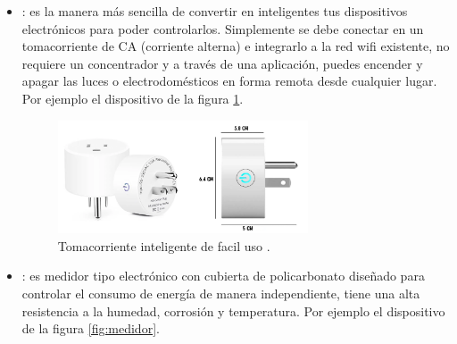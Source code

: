 \begin{itemize}

\item {}: es la manera más sencilla de convertir en inteligentes tus dispositivos electrónicos para poder controlarlos. Simplemente se debe conectar en un tomacorriente de CA (corriente alterna) e integrarlo a la red wifi existente, no requiere un concentrador y a través de una aplicación, puedes encender y apagar las luces o electrodomésticos en forma remota desde cualquier lugar. Por ejemplo el dispositivo de la figura \ref{fig:tomacorriente}.

\begin{figure}[htbp]
	\centering
\includegraphics[width=0.7\textwidth]{./Figures/tomacorriente.png}
	\caption{Tomacorriente inteligente de facil uso \protect\footnotemark.}
	\label{fig:tomacorriente}
\end{figure}


\vspace{1cm}
\vspace{1cm}
\vspace{1cm}
\vspace{1cm}
\vspace{1cm}
\vspace{1cm}
\vspace{1cm}
\vspace{1cm}



\item {}: es medidor tipo electrónico con cubierta de policarbonato diseñado para controlar el consumo de energía de manera independiente, tiene una alta resistencia a la humedad, corrosión y temperatura. Por ejemplo el dispositivo de la figura \ref{fig:medidor}.


\end{itemize}
